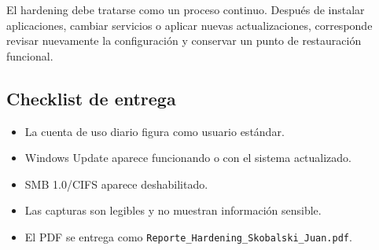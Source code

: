 \documentclass[11pt,a4paper]{article}
\begin{document}
El hardening debe tratarse como un proceso continuo. Después de instalar aplicaciones, cambiar servicios o aplicar nuevas actualizaciones, corresponde revisar nuevamente la configuración y conservar un punto de restauración funcional.

\subsection*{Checklist de entrega}

\begin{itemize}
  \item La cuenta de uso diario figura como usuario estándar.
  \item Windows Update aparece funcionando o con el sistema actualizado.
  \item SMB 1.0/CIFS aparece deshabilitado.
  \item Las capturas son legibles y no muestran información sensible.
  \item El PDF se entrega como \texttt{Reporte\_Hardening\_Skobalski\_Juan.pdf}.
\end{itemize}
\end{document}
